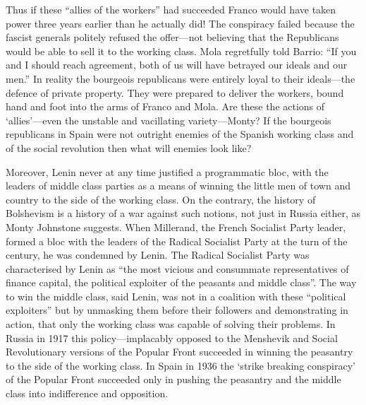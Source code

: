 \documentclass[
  12pt,
  pagesize,
  paper = 6in:9in,
  DIV = 12,
  openany
]{scrbook}
\begin{document}
Thus if these “allies of the workers” had succeeded Franco would
have taken power three years earlier than he actually did! The
conspiracy failed because the fascist generals politely refused the
offer---not believing that the Republicans would be able to sell it to the working
class. Mola regretfully told Barrio: “If you and I should reach
agreement, both of us will have betrayed our ideals and our men.”
In reality the bourgeois republicans were entirely loyal to their
ideals---the defence of private property. They were prepared to deliver
the workers, bound hand and foot into the arms of Franco and Mola.
Are these the actions of ‘allies’---even the unstable and vacillating
variety---Monty? If the bourgeois republicans in Spain were not
outright enemies of the Spanish working class and of the social
revolution then what will enemies look like?

Moreover, Lenin never at any time justified a programmatic bloc,
with the leaders of middle class parties as a means of winning the
little men of town and country to the side of the working class. On
the contrary, the history of Bolshevism is a history of a war against
such notions, not just in Russia either, as Monty Johnstone suggests.
When Millerand, the French Socialist Party leader, formed a bloc
with the leaders of the Radical Socialist Party at the turn of the century,
he was condemned by Lenin. The Radical Socialist Party was
characterised by Lenin as “the most vicious and consummate
representatives of finance capital, the political exploiter of the
peasants and middle class”. The way to win the middle class, said
Lenin, was not in a coalition with these “political exploiters” but
by unmasking them before their followers and demonstrating in action,
that only the working class was capable of solving their problems.
In Russia in 1917 this policy---implacably opposed to the Menshevik
and Social Revolutionary versions of the Popular Front succeeded
in winning the peasantry to the side of the working class.
In Spain in 1936 the `strike breaking conspiracy' of the Popular Front
succeeded only in pushing the peasantry and the middle class into
indifference and opposition.
\end{document}
